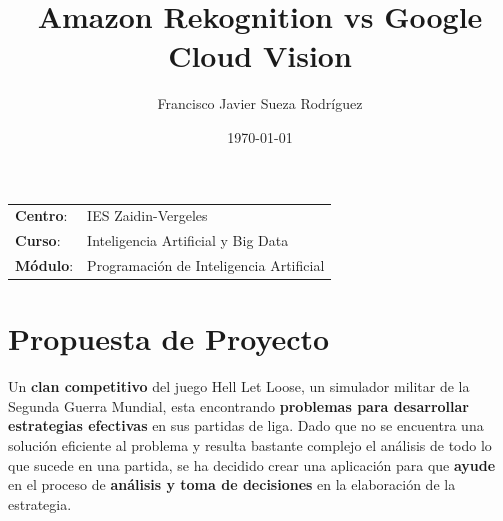 


\title{
\vspace{10ex}
\normalfont \normalsize
\huge \textbf{Amazon Rekognition vs Google Cloud Vision}
}
\author{Francisco Javier Sueza Rodríguez}
\date{\normalsize\today}

\glsenablehyper
\makeglossaries
{}




\maketitle

\thispagestyle{empty}

\vspace{75ex}

\begin{center}
    \begin{tabular}{l l}
        \textbf{Centro}: & IES Zaidin-Vergeles \\
        \textbf{Curso}: & Inteligencia Artificial y Big Data\\
        \textbf{Módulo}: & Programación de Inteligencia Artificial\\
    \end{tabular}
\end{center}

\newpage

\begingroup
\hypersetup{linkcolor=black}
\tableofcontents
\endgroup

\newpage

\begingroup
\hypersetup{linkcolor=black}
\listoffigures             
\endgroup

\newpage

\section{Propuesta de Proyecto}
Un \textbf{clan competitivo} del juego Hell Let Loose, un simulador militar de la Segunda Guerra Mundial, esta encontrando \textbf{problemas para desarrollar estrategias efectivas} en sus partidas de liga. Dado que no se encuentra una solución eficiente al problema y resulta bastante complejo el análisis de todo lo que sucede en una partida, se ha decidido crear una aplicación para que \textbf{ayude} en el proceso de \textbf{análisis y toma de decisiones} en la elaboración de la estrategia.

